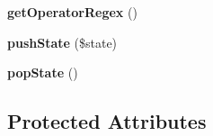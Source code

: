 \begin{DoxyCompactItemize}
\item 
{\bfseries get\+Operator\+Regex} ()\hypertarget{classTwig__Lexer_aa6a30e4a8edd366772cfc3994bc221fe}{}\label{classTwig__Lexer_aa6a30e4a8edd366772cfc3994bc221fe}

\item 
{\bfseries push\+State} (\$state)\hypertarget{classTwig__Lexer_aa4d38056986860cd0d67eb4953ac80ee}{}\label{classTwig__Lexer_aa4d38056986860cd0d67eb4953ac80ee}

\item 
{\bfseries pop\+State} ()\hypertarget{classTwig__Lexer_a27883ea0089b17183eb61b675d654b60}{}\label{classTwig__Lexer_a27883ea0089b17183eb61b675d654b60}

\end{DoxyCompactItemize}
\subsection*{Protected Attributes}
